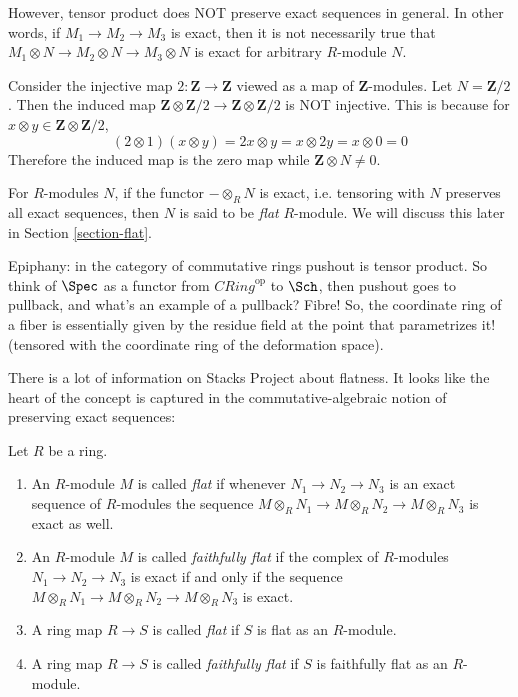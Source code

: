 \documentclass{book}
\begin{document}
\begin{remark}
\label{remark-tensor-product-not-exact}
However, tensor product does NOT preserve
exact sequences in general.
In other words, if $M_1 \to M_2 \to M_3$ is
exact, then it is not necessarily true that
$M_1 \otimes N \to M_2 \otimes N \to M_3
\otimes N$
is exact for arbitrary $R$-module $N$.
\end{remark}

\begin{example}
\label{example-tensor-product-not-exact}
Consider the injective map $2 : \mathbf{Z}\to
\mathbf{Z}$
viewed as a map of $\mathbf{Z}$-modules.
Let $N = \mathbf{Z}/2$. Then the induced map
$\mathbf{Z} \otimes \mathbf{Z}/2 \to
\mathbf{Z} \otimes \mathbf{Z}/2$
is NOT injective. This is because for
$x \otimes y\in \mathbf{Z} \otimes
\mathbf{Z}/2$,
$$
(2 \otimes 1)(x \otimes y) = 2x \otimes y = x
\otimes 2y = x \otimes 0 = 0
$$
Therefore the induced map is the zero map
while $\mathbf{Z} \otimes N\neq 0$.
\end{example}

\begin{definition}
\label{definition-flat-module}
For $R$-modules $N$, if the
functor $-\otimes_R N$ is exact, i.e.
tensoring
with $N$ preserves all exact
sequences, then $N$ is said to be {\it flat}
$R$-module.
We will discuss this later in Section
\ref{section-flat}.
\end{definition}

\medskip\noindent
Epiphany:
in the category of commutative rings
pushout is tensor product.
So think of $\Spec $ as a functor
from $\mathit{CRing}^{\text{op}}$ to $\Sch$,
then pushout goes to pullback,
and what's an example of a pullback?
Fibre!
So, the coordinate ring of a fiber
is essentially given by the residue field
at the point that parametrizes it!
(tensored with the coordinate ring
of the deformation space).

There is a lot of information on Stacks
Project about flatness.
It looks like the heart of the concept is
captured in the commutative-algebraic notion
of preserving
exact sequences:

\begin{definition}
\label{definition-flat}
Let $R$ be a ring.
\begin{enumerate}
\item An $R$-module $M$ is called {\it flat}
if whenever
$N_1 \to N_2 \to N_3$ is an exact sequence of
$R$-modules
the sequence $M \otimes_R N_1 \to M \otimes_R
N_2 \to M \otimes_R N_3$
is exact as well.
\item An $R$-module $M$ is called {\it
faithfully flat} if the
complex of $R$-modules
$N_1 \to N_2 \to N_3$ is exact if and only if
the sequence $M \otimes_R N_1 \to M \otimes_R
N_2 \to M \otimes_R N_3$
is exact.
\item A ring map $R \to S$ is called {\it
flat} if
$S$ is flat as an $R$-module.
\item A ring map $R \to S$ is called {\it
faithfully flat} if
$S$ is faithfully flat as an $R$-module.
\end{enumerate}
\end{definition}
\end{document}
